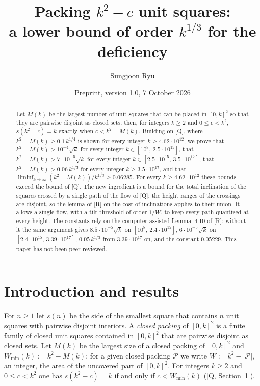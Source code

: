 \documentclass[11pt]{amsart}
\title[Deficiency of order $k^{1/3}$]{Packing $k^2-c$ unit squares:\\ a lower bound of order $k^{1/3}$ for the deficiency}
\author{Sungjoon Ryu}
\date{Preprint, version 1.0, 7 October 2026}
\newcommand{\cP}{\mathcal P}
\newcommand{\Wmin}{W_{\min}}
\theoremstyle{definition}
\theoremstyle{remark}
\numberwithin{equation}{section}
\begin{document}
\begin{abstract}
Let $M(k)$ be the largest number of unit squares that can be placed in $[0,k]^2$ so that they are pairwise disjoint as
closed sets; then, for integers $k\ge2$ and $0\le c<k^2$, $s(k^2-c)=k$ exactly when $c<k^2-M(k)$. Building on [Q], where
$k^2-M(k)\ge0.1\,k^{1/4}$ is shown for every integer $k\ge4.62\cdot10^{12}$, we prove that $k^2-M(k)>10^{-4}\sqrt k$
for every integer $k\in[10^8,\,2.5\cdot10^{15}]$, that $k^2-M(k)>7\cdot10^{-5}\sqrt k$ for every integer
$k\in[2.5\cdot10^{15},\,3.5\cdot10^{17}]$, that $k^2-M(k)>0.06\,k^{1/3}$ for every integer $k\ge3.5\cdot10^{17}$, and
that $\liminf_{k\to\infty}(k^2-M(k))/k^{1/3}\ge0.06285$. For every $k\ge4.62\cdot10^{12}$ these bounds exceed the bound
of [Q]. The new ingredient is a bound for the total inclination of the squares crossed by a single path of the flow of
[Q]: the height ranges of the crossings are disjoint, so the lemma of [R] on the cost of inclinations applies to their
union. It allows a single flow, with a tilt threshold of order $1/W$, to keep every path quantized at every height. The
constants rely on the computer-assisted Lemma~4.10 of [R]; without it the same argument gives $8.5\cdot10^{-5}\sqrt k$
on $[10^8,\,2.4\cdot10^{15}]$, $6\cdot10^{-5}\sqrt k$ on $[2.4\cdot10^{15},\,3.39\cdot10^{17}]$, $0.05\,k^{1/3}$ from
$3.39\cdot10^{17}$ on, and the constant $0.05229$. This paper has not been peer reviewed.
\end{abstract}
\maketitle

\section{Introduction and results}\label{sec:intro}

For $n\ge1$ let $s(n)$ be the side of the smallest square that contains $n$ unit squares with pairwise disjoint
interiors. A \emph{closed packing} of $[0,k]^2$ is a finite family of closed unit squares contained in $[0,k]^2$ that
are pairwise disjoint as closed sets. Let $M(k)$ be the largest size of a closed packing of $[0,k]^2$ and
$\Wmin(k):=k^2-M(k)$; for a given closed packing $\cP$ we write $W:=k^2-|\cP|$, an integer, the area of the uncovered
part of $[0,k]^2$. For integers $k\ge2$ and $0\le c<k^2$ one has $s(k^2-c)=k$ if and only if $c<\Wmin(k)$
([Q, Section~1]).
\end{document}
